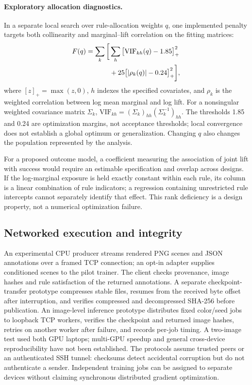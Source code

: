\documentclass{article}
\begin{document}
\paragraph{Exploratory allocation diagnostics.} In a separate local search over rule-allocation weights $q$, one implemented penalty targets both collinearity and marginal--lift correlation on the fitting matrices:
\begin{align}
 F(q)=\sum_k\bigg[&\sum_h\big[\mathrm{VIF}_{kh}(q)-1.85\big]_+^2\notag\\
 &+25\big[|\rho_k(q)|-0.24\big]_+^2\bigg],
\end{align}
where $[z]_+=\max(z,0)$, $h$ indexes the specified covariates, and $\rho_k$ is the weighted correlation between log mean marginal and log lift. For a nonsingular weighted covariance matrix $\Sigma_k$, $\mathrm{VIF}_{kh}=(\Sigma_k)_{hh}(\Sigma_k^{-1})_{hh}$. The thresholds 1.85 and 0.24 are optimization margins, not acceptance thresholds; local convergence does not establish a global optimum or generalization. Changing $q$ also changes the population represented by the analysis.

For a proposed outcome model, a coefficient measuring the association of joint lift with success would require an estimable specification and overlap across designs. If the log-marginal exposure is held exactly constant within each rule, its column is a linear combination of rule indicators; a regression containing unrestricted rule intercepts cannot separately identify that effect. This rank deficiency is a design property, not a numerical optimization failure.

\subsection{Networked execution and integrity}
An experimental CPU producer streams rendered PNG scenes and JSON annotations over a framed TCP connection; an opt-in adapter supplies conditioned scenes to the pilot trainer. The client checks provenance, image hashes and rule satisfaction of the returned annotations. A separate checkpoint-transfer prototype compresses stable files, resumes from the received byte offset after interruption, and verifies compressed and decompressed SHA-256 before publication. An image-level inference prototype distributes fixed color/seed jobs to loopback TCP workers, verifies the checkpoint and returned image hashes, retries on another worker after failure, and records per-job timing. A two-image test used both GPU laptops; multi-GPU speedup and general cross-device reproducibility have not been established. The protocols assume trusted peers or an authenticated SSH tunnel: checksums detect accidental corruption but do not authenticate a sender. Independent training jobs can be assigned to separate devices without claiming synchronous distributed gradient optimization.
\end{document}
